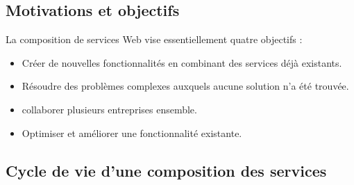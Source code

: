     \subsection{Motivations et objectifs}
    \label{sec:objectifs}
    


    

    La composition de services Web vise essentiellement quatre
    objectifs \cite{driss2011approche}:
    \begin{itemize}

      \item Créer de nouvelles fonctionnalités en combinant des services
        déjà existants.

      \item Résoudre des problèmes complexes auxquels aucune solution
        n'a été trouvée.

      \item collaborer plusieurs entreprises ensemble.

      \item Optimiser et améliorer une fonctionnalité existante.
    \end{itemize}

    \subsection{Cycle de vie d'une composition des services}
    \label{sec:cycle-de-vie}
    
    \newpage

